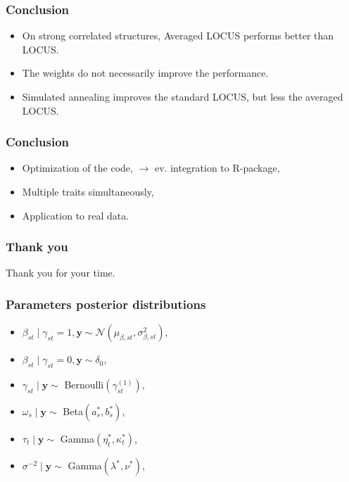 \documentclass{beamer}
\begin{document}
\begin{frame}
\frametitle{Conclusion}
\begin{itemize}
\item On strong correlated structures, Averaged LOCUS performs better than LOCUS.
\item The weights do not necessarily improve the performance.
\item Simulated annealing improves the standard LOCUS, but less the averaged LOCUS.
\end{itemize}
\end{frame}

\begin{frame}
\frametitle{Conclusion}
\begin{itemize}
\item Optimization of the code, $\rightarrow$ ev. integration to R-package,
\item Multiple traits simultaneously,
\item Application to real data.

\end{itemize}
\end{frame}

\begin{frame}
\frametitle{Thank you}
Thank you for your time.
\end{frame}

\begin{frame}
\frametitle{Parameters posterior distributions}
\begin{itemize}
\item $\beta_{st} \mid \gamma_{st} = 1, \boldsymbol{y} \sim \mathcal{N}\left(\mu_{\beta,st},\sigma_{\beta,st}^2\right)$,
\item $\beta_{st} \mid \gamma_{st} = 0, \boldsymbol{y} \sim \delta_0$,
\item $\gamma_{st} \mid \boldsymbol{y} \sim $ Bernoulli$(\gamma_{st}^{(1)})$,
\item $\omega_s \mid \boldsymbol{y} \sim $ Beta$(a^*_s, b^*_s)$,
\item $\tau_t \mid \boldsymbol{y} \sim $ Gamma$(\eta_t^*, \kappa_t^*)$,
\item $\sigma^{-2} \mid \boldsymbol{y} \sim $ Gamma$(\lambda^*,\nu^*)$,
\end{itemize}
\end{frame}
\end{document}
